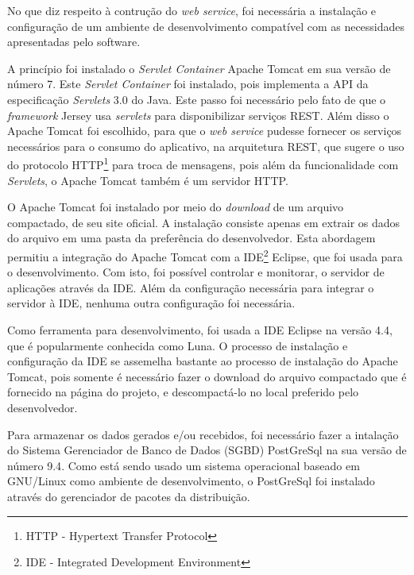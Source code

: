 	
	\par No que diz respeito à contrução do \textit{web service}, foi necessária a
instalação e configuração de um ambiente de desenvolvimento compatível com as
necessidades apresentadas pelo software.

	\par A princípio foi instalado o \textit{Servlet Container} Apache Tomcat em
sua versão de número {7}. Este \textit{Servlet Container} foi instalado, pois
implementa a API da especificação \textit{Servlets} {3.0} do Java. Este passo
foi necessário pelo fato de que o \textit{framework} Jersey usa
\textit{servlets} para disponibilizar serviços REST. Além disso o Apache Tomcat
foi escolhido, para que o \textit{web service} pudesse fornecer os serviços
necessários para o consumo do aplicativo, na arquitetura REST, que sugere o uso
do protocolo HTTP\footnote{HTTP - Hypertext Transfer Protocol} para troca de
mensagens, pois além da funcionalidade com \textit{Servlets}, o Apache Tomcat
também é um servidor HTTP.
	
	\par O Apache Tomcat foi instalado por meio do \textit{download} de um
arquivo compactado, de seu site oficial. A instalação consiste apenas
em extrair os dados do arquivo em uma pasta da preferência do desenvolvedor.
Esta abordagem permitiu a integração do Apache Tomcat com a
IDE\footnote{IDE - Integrated Development Environment}
Eclipse, que foi usada para o desenvolvimento. Com isto, foi possível controlar
e monitorar, o servidor de aplicações através da IDE. Além da configuração
necessária para integrar o servidor à IDE, nenhuma outra configuração foi
necessária.

	\par Como ferramenta para desenvolvimento, foi usada a IDE Eclipse na versão
{4.4}, que é popularmente conhecida como Luna. O processo de instalação e
configuração da IDE se assemelha bastante ao processo de instalação do Apache
Tomcat, pois somente é necessário fazer o download do arquivo compactado que é
fornecido na página do projeto, e descompactá-lo no local preferido pelo
desenvolvedor.

	\par Para armazenar os dados gerados e/ou recebidos, foi necessário fazer a
intalação do Sistema Gerenciador de Banco de Dados (SGBD) PostGreSql na sua
versão de número {9.4}. Como está sendo usado um sistema operacional baseado em
GNU/Linux como ambiente de desenvolvimento, o PostGreSql foi instalado através
do gerenciador de pacotes da distribuição.
 
